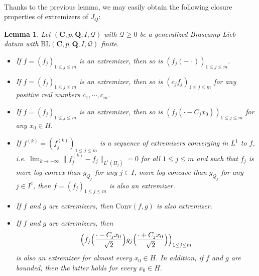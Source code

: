 \documentclass[11pt,a4paper,reqno]{amsart}
\numberwithin{equation}{section}
\newtheorem{lemma}[theorem]{Lemma}
\theoremstyle{definition}
\newcommand{\<}{\ensuremath \leq}
\renewcommand{\>}{\ensuremath \geq}
\begin{document}
\hfill \\


Thanks to the previous lemma, we may easily obtain the following closure properties of extremizers of $J_Q$: 

\begin{lemma} \label{Closure_prop_extremizers}
    Let $(\textbf{C},p,\textbf{Q},I,\mathcal Q)$ with $\mathcal Q \geq 0$ be a generalized Brascamp-Lieb datum with $\mathrm{BL}(\textbf{C},p,\textbf{Q},I,\mathcal Q)$ finite.
    \begin{itemize}
        \item [(i)] If $f=(f_j)_{1 \leq j \leq m}$ is an extremizer, then so is $(f_j(-\cdot))_{1 \leq j \leq m}.$
        \item[(ii)] If $f=(f_j)_{1 \leq j \leq m}$ is an extremizer, then so is $(c_jf_j)_{1 \leq j \leq m}$ for any positive real numbers $c_1,\cdots,c_m.$
        \item[(iii)] If $f=(f_j)_{1 \leq j \leq m}$ is an extremizer, then so is $(f_j(\cdot-C_jx_0))_{1 \leq j \leq m}$ for any $x_0 \in H.$ 
        \item[(iv)] If $f^{(k)}=(f_j^{(k)})_{1 \leq j \leq m}$ is a sequence of extremizers converging in $L^1$ to $f$, \textit{i.e.} $\lim_{k \rightarrow +\infty}\|f_j^{(k)}-f_j\|_{L^1(H_j)}=0$ for all $1 \leq j \leq m$ and such that $f_j$ is more log-convex than $g_{Q_j}$ for any $j \in I$, more log-concave than $g_{Q_j}$ for any $j \in I^c$, then $f=(f_j)_{1 \le j \le m}$ is also an extremizer.
        \item[(v)] If $f$ and $g$ are extremizers, then $\mathrm{Conv}(f,g)$ is also extremizer.
        \item[(vi)] If $f$ and $g$ are extremizers, then $$\Bigl(f_j\Bigl(\frac{\cdot-C_jx_0}{\sqrt{2}}\Bigl)g_j\Bigl(\frac{\cdot+C_jx_0}{\sqrt{2}}\Bigl)\Bigl)_{1 \leq j \leq m}$$ is also an extremizer for almost every $x_0 \in H.$ In addition, if $f$ and $g$ are bounded, then the latter holds for every $x_0 \in H.$ 
    \end{itemize}
\end{lemma}
\end{document}

